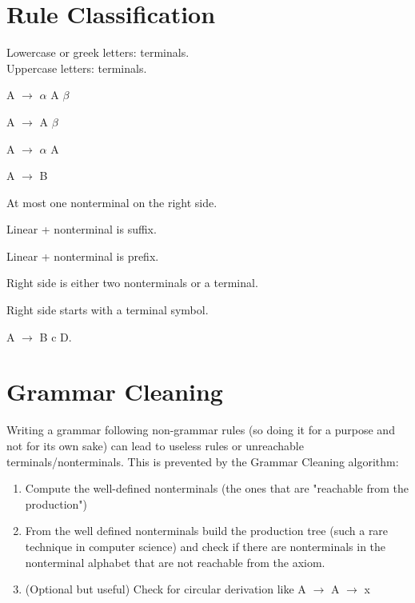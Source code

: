 	\section{Rule Classification}
	    Lowercase or greek letters: terminals.\\
	    Uppercase letters: terminals.
		\begin{definition}[Recursive]
			A $\rightarrow$ $\alpha$ A $\beta$ 
		\end{definition}
		\begin{definition}
			A $\rightarrow$ A $\beta$ 
		\end{definition}
		\begin{definition}
			A $\rightarrow$ $\alpha$ A
		\end{definition}
		\begin{definition}[Copy]
			A $\rightarrow$ B
		\end{definition}
		\begin{definition}[Linear]
			At most one nonterminal on the right side.
		\end{definition}
		\begin{definition}
			Linear + nonterminal is suffix.
		\end{definition}
		\begin{definition}
			Linear + nonterminal is prefix.
		\end{definition}
		\begin{definition}[Chomsky]
			Right side is either two nonterminals or a terminal.
		\end{definition}
		\begin{definition}
			Right side starts with a terminal symbol.
		\end{definition}
		\begin{definition}
			A $\rightarrow$ B c D.
		\end{definition}
    
    \section{Grammar Cleaning}
        Writing a grammar following non-grammar rules (so doing it for a purpose and not for its own sake) can lead to useless rules or unreachable terminals/nonterminals. This is prevented by the Grammar Cleaning algorithm:
            \begin{enumerate}
                \item Compute the well-defined nonterminals (the ones that are "reachable from the production")
                \item From the well defined nonterminals build the production tree (such a rare technique in computer science) and check if there are nonterminals in the nonterminal alphabet that are not reachable from the axiom.
                \item (Optional but useful) Check for circular derivation like A $\rightarrow$ A $\rightarrow$ x
            \end{enumerate}
    
